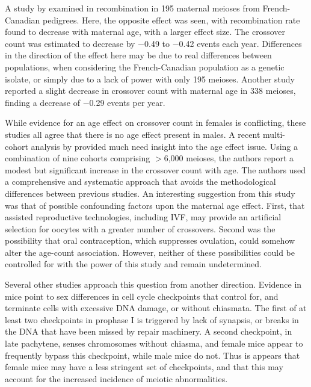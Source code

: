 A study by \citet{Hussin2011} examined in recombination in 195 maternal meioses from French-Canadian pedigrees.
Here, the opposite effect was seen, with recombination rate found to decrease with maternal age, with a larger effect size.
The crossover count was estimated to decrease by $-$0.49 to $-$0.42 events each year.
Differences in the direction of the effect here may be due to real differences between populations, when considering the French-Canadian population as a genetic isolate, or simply due to a lack of power with only 195 meioses.
Another study reported a slight decrease in crossover count with maternal age in 338 meioses, finding a decrease of $-$0.29 events per year\cite{Bleazard2013}.


While evidence for an age effect on crossover count in females is conflicting, these studies all agree that there is no age effect present in males.
A recent multi-cohort analysis by \citet{Martin2015} provided much need insight into the age effect issue.
Using a combination of nine cohorts comprising $>$6,000 meioses, the authors report a modest but significant increase in the crossover count with age.
The authors used a comprehensive and systematic approach that avoids the methodological differences between previous studies.
An interesting suggestion from this study was that of possible confounding factors upon the maternal age effect.
First, that assisted reproductive technologies, including IVF, may provide an artificial selection for oocytes with a greater number of crossovers.
Second was the possibility that oral contraception, which suppresses ovulation, could somehow alter the age-count association. %
However, neither of these possibilities could be controlled for with the power of this study and remain undetermined.

Several other studies approach this question from another direction.
Evidence in mice point to sex differences in cell cycle checkpoints that control for, and terminate cells with excessive DNA damage, or without chiasmata\cite{Cohen2006}.
The first of at least two checkpoints in prophase I is triggered by lack of synapsis, or breaks in the DNA that have been missed by repair machinery.
A second checkpoint, in late pachytene, senses chromosomes without chiasma, and female mice appear to frequently bypass this checkpoint, while male mice do not.
Thus is appears that female mice may have a less stringent set of checkpoints, and that this may account for the increased incidence of meiotic abnormalities\cite{Cohen2006}.

